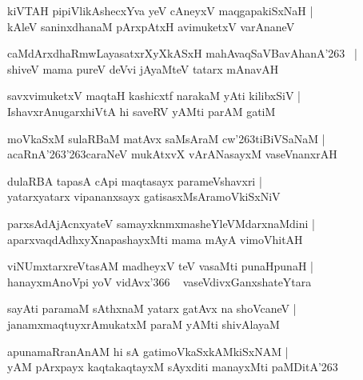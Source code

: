 \documentclass[twoside,12pt,openright]{book}
\def\S{\char'263}
\newcounter{shloka}[chapter]
\begin{document}
\begin{shloka}
kiVTAH pipiVlikAshecxYva yeV cAneyxV maqgapakiSxNaH |\\
kAleV saninxdhanaM pArxpAtxH avimuketxV varAnaneV 
\end{shloka}

\begin{shloka}
caMdArxdhaRmwLayasatxrXyXkASxH mahAvaqSaVBavAhanA\S ~ |\\
shiveV mama pureV deVvi jAyaMteV tatarx mAnavAH 
\end{shloka}

\begin{shloka}
savxvimuketxV maqtaH kashicxtf narakaM yAti kilibxSiV |\\
IshavxrAnugarxhiVtA hi saveRV yAMti parAM gatiM 
\end{shloka}

\begin{shloka}
moVkaSxM sulaRBaM matAvx saMsAraM cw\S tiBiVSaNaM |\\
acaRnA\S\S caraNeV mukAtxvX vArANasayxM vaseVnanxrAH 
\end{shloka}

\begin{shloka}
dulaRBA tapasA cApi maqtasayx parameVshavxri |\\
yatarxyatarx vipananxsayx gatisasxMsAramoVkiSxNiV 
\end{shloka}

\begin{shloka}
parxsAdAjAcnxyateV samayxknmxmasheYleVMdarxnaMdini |\\
aparxvaqdAdhxyXnapashayxMti mama mAyA vimoVhitAH 
\end{shloka}

\begin{shloka}
viNUmxtarxreVtasAM madheyxV teV vasaMti punaHpunaH |\\
hanayxmAnoVpi yoV vidAvx\char'366 ~ vaseVdivxGanxshateYtara
\end{shloka}

\begin{shloka}
sayAti paramaM sAthxnaM yatarx gatAvx na shoVcaneV |\\
janamxmaqtuyxrAmukatxM paraM yAMti shivAlayaM 
\end{shloka}

\begin{shloka}
apunamaRranAnAM hi sA gatimoVkaSxkAMkiSxNAM |\\
yAM pArxpayx kaqtakaqtayxM sAyxditi manayxMti paMDitA\S
\end{shloka}
\end{document}
